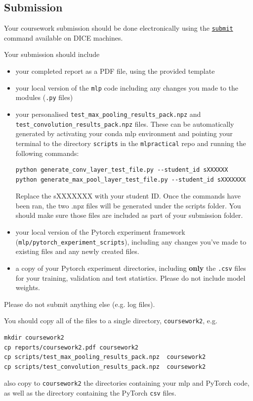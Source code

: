 \documentclass[11pt,]{article}
\begin{document}
\subsection{Submission}
\label{sec:submission}

Your coursework submission should be done electronically using the
\href{http://computing.help.inf.ed.ac.uk/submit}{\texttt{submit}}
command available on DICE machines.

Your submission should include

\begin{itemize}

\item
  your completed report as a PDF file, using the provided template
\item
  your local version of the \texttt{mlp} code including any changes
  you made to the modules (\texttt{.py} files)
 \item your personalised \texttt{test\_max\_pooling\_results\_pack.npz} and \texttt{test\_convolution\_results\_pack.npz} files. These can be automatically generated by activating your conda mlp environment and pointing your terminal to the directory \texttt{scripts} in the \texttt{mlpractical} repo and running the following commands: 
 \begin{verbatim}
python generate_conv_layer_test_file.py --student_id sXXXXXX
python generate_max_pool_layer_test_file.py --student_id sXXXXXXX
\end{verbatim}
Replace the sXXXXXXX with your student ID. Once the commands have been ran, the two .npz files will be generated under the scripts folder. You should make sure those files are included as part of your submission folder.

 \item your local version of the Pytorch experiment framework (\texttt{mlp/pytorch\_experiment\_scripts}), including any changes you've made to existing files and any newly created files.
 \item a copy of your Pytorch experiment directories, including \textbf{only} the \texttt{.csv} files for your training, validation and test statistics. Please do not include model weights.

\end{itemize}
Please do not submit anything else (e.g. log files).

You should copy all of the files to a single directory, \verb+coursework2+, e.g.

\begin{verbatim}
mkdir coursework2
cp reports/coursework2.pdf coursework2
cp scripts/test_max_pooling_results_pack.npz  coursework2
cp scripts/test_convolution_results_pack.npz  coursework2
\end{verbatim}
also copy to \texttt{coursework2} the directories containing your mlp and PyTorch code, as well as the directory containing the PyTorch \texttt{csv} files.
\end{document}
